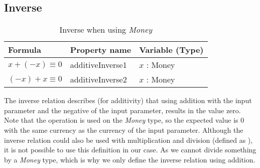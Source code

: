 \subsection*{Inverse}
\label{ssct:properties_inverse}
\begin{table}[!ht]
\centering
\begin{tabular}{lll}
\hline
                        \textbf{Formula}    & \textbf{Property name} & \textbf{Variable (Type)} \\ \hline
\rowcolor[HTML]{EFEFEF} $x + (-x) \equiv 0$ & additiveInverse1       & $x$ : Money              \\
                        $(-x) + x \equiv 0$ & additiveInverse2       & $x$ : Money              \\ \hline
\end{tabular}
\caption{Inverse when using \textit{Money}}
\label{tbl:ch4_money_inverse}
\end{table}
\FloatBarrier\noindent
The inverse relation describes (for additivity) that using addition with the
input parameter and the negative of the input parameter, results in the value
zero. Note that the operation is used on the \textit{Money} type, so the
expected value is 0 with the same currency as the currency of the input
parameter. Although the inverse relation could also be used with multiplication
and division (defined as ), it is not possible to use this
definition in our case. As we cannot divide something by a \textit{Money}
type, which is why we only define the inverse relation using addition.
\clearpage %
